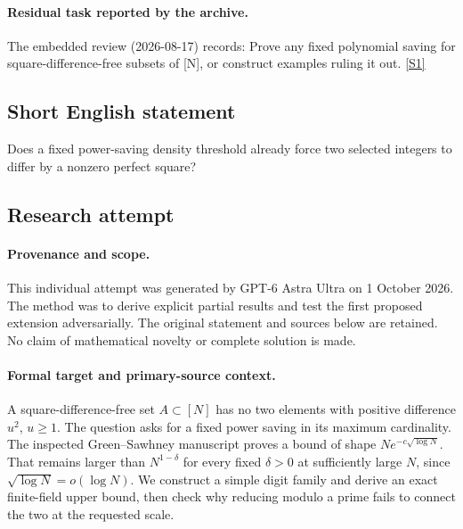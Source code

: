 \documentclass[11pt,a4paper]{article}
\newcommand{\sref}[2]{\hyperlink{source:#1:#2}{[S#2]}}
\begin{document}
\paragraph{Residual task reported by the archive.}

The embedded review (2026-08-17) records: Prove any fixed polynomial saving for square-difference-free subsets of [N], or construct examples ruling it out. \sref{126}{1}

\subsection{Short English statement}

Does a fixed power-saving density threshold already force two selected integers to differ by a nonzero perfect square?

\subsection{Research attempt}

\paragraph{Provenance and scope.}
This individual attempt was generated by GPT-6 Astra Ultra on 1 October 2026. The method was to derive explicit partial results and test the first proposed extension adversarially. The original statement and sources below are retained. No claim of mathematical novelty or complete solution is made.

\paragraph{Formal target and primary-source context.}
A square-difference-free set $A\subset[N]$ has no two elements with positive difference $u^2$, $u\geq1$. The question asks for a fixed power saving in its maximum cardinality. The inspected Green--Sawhney manuscript proves a bound of shape $Ne^{-c\sqrt{\log N}}$. That remains larger than $N^{1-\delta}$ for every fixed $\delta>0$ at sufficiently large $N$, since $\sqrt{\log N}=o(\log N)$. We construct a simple digit family and derive an exact finite-field upper bound, then check why reducing modulo a prime fails to connect the two at the requested scale.
\end{document}
